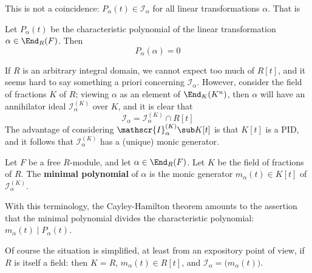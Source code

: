 This is not a coincidence: $P_\alpha(t)\in\mathscr{I}_\alpha$ for all linear transformations $\alpha$. That is
\begin{theorem}\label{Cayley Hamilton}
Let $P_\alpha(t)$ be the characteristic polynomial of the linear transformation $\alpha\in\End_R(F)$. Then
\[P_\alpha(\alpha)=0\]
\end{theorem}
If $R$ is an arbitrary integral domain, we cannot expect too much of $R[t]$, and it seems hard to say something a priori concerning $\mathscr{I}_\alpha$. However, consider the field of fractions $K$ of $R$; viewing $\alpha$ as an element of $\End_K(K^n)$, then $\alpha$ will have an annihilator ideal $\mathscr{I}^{(K)}_\alpha$ over $K$, and it is clear that
\[\mathscr{I}_\alpha=\mathscr{I}^{(K)}_\alpha\cap R[t]\]
The advantage of considering $\mathscr{I}^{(K)}_\alpha\sub K[t]$ is that $K[t]$ is a PID, and it follows that $\mathscr{I}^{(K)}_\alpha$ has a (unique) monic generator.
\begin{definition}
Let $F$ be a free $R$-module, and let $\alpha\in\End_R(F)$. Let $K$ be the field of fractions of $R$. The \textbf{minimal polynomial} of $\alpha$ is the monic generator $m_\alpha(t)\in K[t]$ of $\mathscr{I}^{(K)}_\alpha$.
\end{definition}
With this terminology, the Cayley-Hamilton theorem amounts to the assertion that the minimal polynomial divides the characteristic polynomial: $m_\alpha(t)\mid P_\alpha(t)$.\par
Of course the situation is simplified, at least from an expository point of view, if $R$ is itself a field: then $K=R$, $m_\alpha(t)\in R[t]$, and $\mathscr{I}_\alpha=\big(m_\alpha(t)\big)$. 
